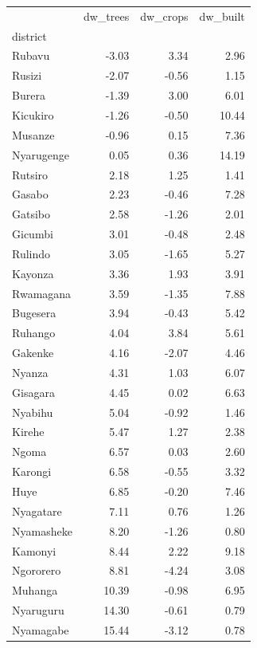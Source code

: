 \begin{tabular}{lrrr}
\toprule
 & dw\_trees & dw\_crops & dw\_built \\
district &  &  &  \\
\midrule
Rubavu & -3.03 & 3.34 & 2.96 \\
Rusizi & -2.07 & -0.56 & 1.15 \\
Burera & -1.39 & 3.00 & 6.01 \\
Kicukiro & -1.26 & -0.50 & 10.44 \\
Musanze & -0.96 & 0.15 & 7.36 \\
Nyarugenge & 0.05 & 0.36 & 14.19 \\
Rutsiro & 2.18 & 1.25 & 1.41 \\
Gasabo & 2.23 & -0.46 & 7.28 \\
Gatsibo & 2.58 & -1.26 & 2.01 \\
Gicumbi & 3.01 & -0.48 & 2.48 \\
Rulindo & 3.05 & -1.65 & 5.27 \\
Kayonza & 3.36 & 1.93 & 3.91 \\
Rwamagana & 3.59 & -1.35 & 7.88 \\
Bugesera & 3.94 & -0.43 & 5.42 \\
Ruhango & 4.04 & 3.84 & 5.61 \\
Gakenke & 4.16 & -2.07 & 4.46 \\
Nyanza & 4.31 & 1.03 & 6.07 \\
Gisagara & 4.45 & 0.02 & 6.63 \\
Nyabihu & 5.04 & -0.92 & 1.46 \\
Kirehe & 5.47 & 1.27 & 2.38 \\
Ngoma & 6.57 & 0.03 & 2.60 \\
Karongi & 6.58 & -0.55 & 3.32 \\
Huye & 6.85 & -0.20 & 7.46 \\
Nyagatare & 7.11 & 0.76 & 1.26 \\
Nyamasheke & 8.20 & -1.26 & 0.80 \\
Kamonyi & 8.44 & 2.22 & 9.18 \\
Ngororero & 8.81 & -4.24 & 3.08 \\
Muhanga & 10.39 & -0.98 & 6.95 \\
Nyaruguru & 14.30 & -0.61 & 0.79 \\
Nyamagabe & 15.44 & -3.12 & 0.78 \\
\bottomrule
\end{tabular}
